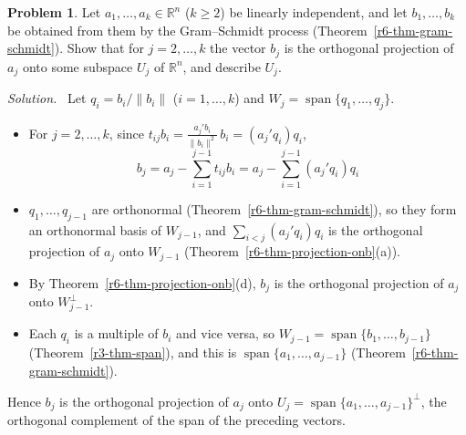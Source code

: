 \documentclass[12pt]{article}
\newcommand{\R}{\mathbb R}
\DeclareMathOperator{\Span}{span}
\theoremstyle{definition}
\newtheorem{problem}{Problem}
\newenvironment{solution}{\par\noindent\textit{Solution.}\ }{\par\smallskip}
\begin{document}
\begin{problem}\label{r6-ex-gs-projection}
Let \(a_1,\dots,a_k\in\R^n\) (\(k\geqslant2\)) be linearly independent, and let \(b_1,\dots,b_k\) be obtained from
them by the Gram--Schmidt process (Theorem~\ref{r6-thm-gram-schmidt}). Show that for \(j=2,\dots,k\) the vector
\(b_j\) is the orthogonal projection of \(a_j\) onto some subspace \(U_j\) of \(\R^n\), and describe \(U_j\).
\end{problem}
\begin{solution}
Let \(q_i=b_i/\lVert b_i\rVert\) (\(i=1,\dots,k\)) and \(W_j=\Span\{q_1,\dots,q_j\}\).
\begin{itemize}
\item For \(j=2,\dots,k\), since \(t_{ij}b_i=\frac{a_j'b_i}{\lVert b_i\rVert^2}\,b_i=(a_j'q_i)q_i\),
\[
b_j=a_j-\sum_{i=1}^{j-1}t_{ij}b_i=a_j-\sum_{i=1}^{j-1}(a_j'q_i)q_i
\]
\item \(q_1,\dots,q_{j-1}\) are orthonormal (Theorem~\ref{r6-thm-gram-schmidt}), so they form an orthonormal basis
of \(W_{j-1}\), and \(\sum_{i<j}(a_j'q_i)q_i\) is the orthogonal projection of \(a_j\) onto \(W_{j-1}\)
(Theorem~\ref{r6-thm-projection-onb}(a)).
\item By Theorem~\ref{r6-thm-projection-onb}(d), \(b_j\) is the orthogonal projection of \(a_j\) onto
\(W_{j-1}^\perp\).
\item Each \(q_i\) is a multiple of \(b_i\) and vice versa, so \(W_{j-1}=\Span\{b_1,\dots,b_{j-1}\}\)
(Theorem~\ref{r3-thm-span}), and this is \(\Span\{a_1,\dots,a_{j-1}\}\) (Theorem~\ref{r6-thm-gram-schmidt}).
\end{itemize}
Hence \(b_j\) is the orthogonal projection of \(a_j\) onto \(U_j=\Span\{a_1,\dots,a_{j-1}\}^\perp\), the orthogonal
complement of the span of the preceding vectors.
\end{solution}
\end{document}
